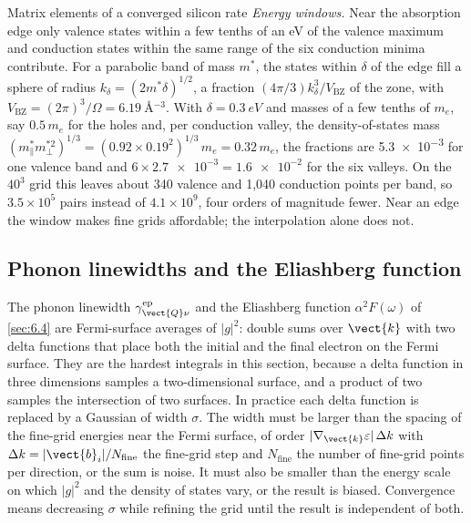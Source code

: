 \begin{workedexample}{Matrix elements of a converged silicon rate}
\emph{Energy windows.} Near the absorption edge only valence states within a few tenths of an eV of the valence maximum and conduction states within the same range of the six conduction minima contribute. For a parabolic band of mass $m^*$, the states within $\delta$ of the edge fill a sphere of radius $k_\delta = (2m^*\delta)^{1/2}$, a fraction $(4\pi/3)k_\delta^3/V_{\mathrm{BZ}}$ of the zone, with $V_{\mathrm{BZ}} = (2\pi)^3/\Omega = \SI{6.19}{\angstrom^{-3}}$. With $\delta = \SI{0.3}{eV}$ and masses of a few tenths of $m_e$, say $0.5\,m_e$ for the holes and, per conduction valley, the density-of-states mass $(m^*_\parallel m^{*2}_\perp)^{1/3} = (0.92\times0.19^2)^{1/3}\,m_e = 0.32\,m_e$, the fractions are \num{5.3e-3} for one valence band and $6\times\num{2.7e-3} = \num{1.6e-2}$ for the six valleys. On the $40^3$ grid this leaves about 340 valence and 1{,}040 conduction points per band, so $3.5\times10^5$ pairs instead of $4.1\times10^9$, four orders of magnitude fewer. Near an edge the window makes fine grids affordable; the interpolation alone does not.
\end{workedexample}

\subsection{Phonon linewidths and the Eliashberg function}

The phonon linewidth $\gamma^{\mathrm{ep}}_{\vect{Q}\nu}$ and the Eliashberg function $\alpha^2F(\omega)$ of \cref{sec:6.4} are Fermi-surface averages of $|g|^2$: double sums over $\vect{k}$ with two delta functions that place both the initial and the final electron on the Fermi surface. They are the hardest integrals in this section, because a delta function in three dimensions samples a two-dimensional surface, and a product of two samples the intersection of two surfaces. In practice each delta function is replaced by a Gaussian of width $\sigma$. The width must be larger than the spacing of the fine-grid energies near the Fermi surface, of order $|\nabla_{\vect{k}}\varepsilon|\,\Delta k$ with $\Delta k = |\vect{b}_i|/N_{\mathrm{fine}}$ the fine-grid step and $N_{\mathrm{fine}}$ the number of fine-grid points per direction, or the sum is noise. It must also be smaller than the energy scale on which $|g|^2$ and the density of states vary, or the result is biased. Convergence means decreasing $\sigma$ while refining the grid until the result is independent of both.

